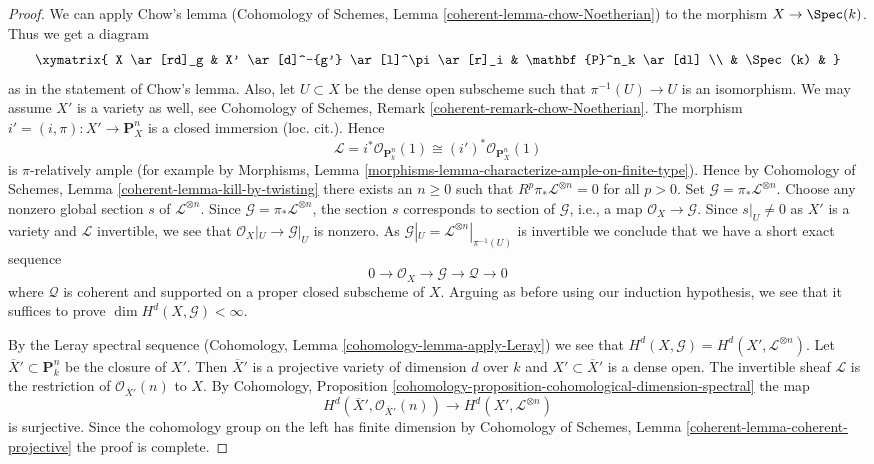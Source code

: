\begin{proof}
\medskip\noindent
We can apply Chow's lemma
(Cohomology of Schemes, Lemma \ref{coherent-lemma-chow-Noetherian})
to the morphism $X \to \Spec(k)$. Thus we get a diagram
$$
\xymatrix{
X \ar[rd]_g & X' \ar[d]^-{g'} \ar[l]^\pi \ar[r]_i & \mathbf{P}^n_k \ar[dl] \\
& \Spec(k) &
}
$$
as in the statement of Chow's lemma. Also, let $U \subset X$ be
the dense open subscheme such that $\pi^{-1}(U) \to U$ is an isomorphism.
We may assume $X'$ is a variety as well, see
Cohomology of Schemes, Remark \ref{coherent-remark-chow-Noetherian}.
The morphism $i' = (i, \pi) : X' \to \mathbf{P}^n_X$ is
a closed immersion (loc. cit.). Hence
$$
\mathcal{L} = i^*\mathcal{O}_{\mathbf{P}^n_k}(1) \cong
(i')^*\mathcal{O}_{\mathbf{P}^n_X}(1)
$$
is $\pi$-relatively ample (for example by
Morphisms, Lemma \ref{morphisms-lemma-characterize-ample-on-finite-type}).
Hence by Cohomology of Schemes, Lemma \ref{coherent-lemma-kill-by-twisting}
there exists an $n \geq 0$ such that
$R^p\pi_*\mathcal{L}^{\otimes n} = 0$ for all $p > 0$.
Set $\mathcal{G} = \pi_*\mathcal{L}^{\otimes n}$.
Choose any nonzero global section $s$ of $\mathcal{L}^{\otimes n}$.
Since $\mathcal{G} = \pi_*\mathcal{L}^{\otimes n}$, the section $s$
corresponds to section of $\mathcal{G}$, i.e., a map
$\mathcal{O}_X \to \mathcal{G}$.
Since $s|_U \not = 0$ as $X'$ is a variety and $\mathcal{L}$
invertible, we see that $\mathcal{O}_X|_U \to \mathcal{G}|_U$
is nonzero. As $\mathcal{G}|_U = \mathcal{L}^{\otimes n}|_{\pi^{-1}(U)}$
is invertible we conclude that we have a short exact sequence
$$
0 \to \mathcal{O}_X \to \mathcal{G} \to \mathcal{Q} \to 0
$$
where $\mathcal{Q}$ is coherent and supported on a proper
closed subscheme of $X$. Arguing as before using our induction
hypothesis, we see that it
suffices to prove $\dim H^d(X, \mathcal{G}) < \infty$.

\medskip\noindent
By the Leray spectral sequence
(Cohomology, Lemma \ref{cohomology-lemma-apply-Leray})
we see that $H^d(X, \mathcal{G}) = H^d(X', \mathcal{L}^{\otimes n})$.
Let $\overline{X}' \subset \mathbf{P}^n_k$ be the closure
of $X'$. Then $\overline{X}'$ is a projective variety of dimension $d$
over $k$ and $X' \subset \overline{X}'$ is a dense open.
The invertible sheaf $\mathcal{L}$ is the restriction of
$\mathcal{O}_{\overline{X}'}(n)$ to $X$. By
Cohomology, Proposition
\ref{cohomology-proposition-cohomological-dimension-spectral}
the map
$$
H^d(\overline{X}', \mathcal{O}_{\overline{X}'}(n))
\longrightarrow
H^d(X', \mathcal{L}^{\otimes n})
$$
is surjective. Since the cohomology group on the left has
finite dimension by
Cohomology of Schemes, Lemma \ref{coherent-lemma-coherent-projective}
the proof is complete.
\end{proof}

